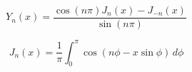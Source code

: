 \[\begin{equation} \label{besselsecond} Y_{n }(x)={\frac {\cos(n \pi )J_n(x)-J_{-n }(x)}{\sin(n \pi )}} \end{equation}\]

\[\begin{equation} \label{thrm4.6} J_{n }(x)={\frac {1}{\pi }}\int _{0}^{\pi }\cos(n \phi -x\sin \phi )\,d\phi \end{equation}\]
